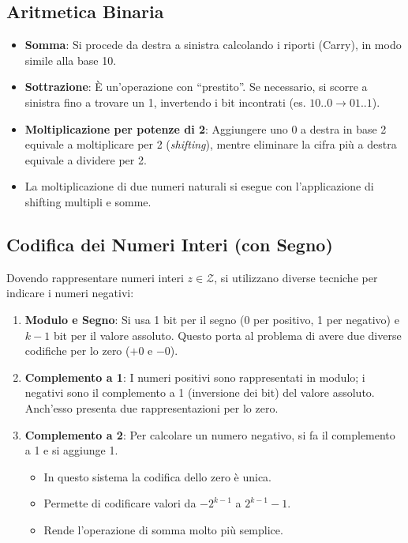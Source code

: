 \documentclass[12pt, a4paper]{article}
\begin{document}
\subsection{Aritmetica Binaria}

\begin{itemize}
    \item \textbf{Somma}: Si procede da destra a sinistra calcolando i riporti (Carry), in modo simile alla base 10. 
    \item \textbf{Sottrazione}: È un'operazione con ``prestito''. Se necessario, si scorre a sinistra fino a trovare un 1, invertendo i bit incontrati (es. $10..0 \rightarrow 01..1$). 
    \item \textbf{Moltiplicazione per potenze di 2}: Aggiungere uno 0 a destra in base 2 equivale a moltiplicare per 2 (\textit{shifting}), mentre eliminare la cifra più a destra equivale a dividere per 2. 
    \item La moltiplicazione di due numeri naturali si esegue con l'applicazione di shifting multipli e somme. 
\end{itemize}

\subsection{Codifica dei Numeri Interi (con Segno)}

Dovendo rappresentare numeri interi $z \in \mathcal{Z}$, si utilizzano diverse tecniche per indicare i numeri negativi: 

\begin{enumerate}
    \item \textbf{Modulo e Segno}: Si usa 1 bit per il segno (0 per positivo, 1 per negativo) e $k-1$ bit per il valore assoluto. Questo porta al problema di avere due diverse codifiche per lo zero ($+0$ e $-0$). 
    \item \textbf{Complemento a 1}: I numeri positivi sono rappresentati in modulo; i negativi sono il complemento a 1 (inversione dei bit) del valore assoluto. Anch'esso presenta due rappresentazioni per lo zero. 
    \item \textbf{Complemento a 2}: Per calcolare un numero negativo, si fa il complemento a 1 e si aggiunge 1. 
    \begin{itemize}
        \item In questo sistema la codifica dello zero è unica. 
        \item Permette di codificare valori da $-2^{k-1}$ a $2^{k-1} - 1$. 
        \item Rende l'operazione di somma molto più semplice. 
    \end{itemize}
\end{enumerate}
\end{document}
